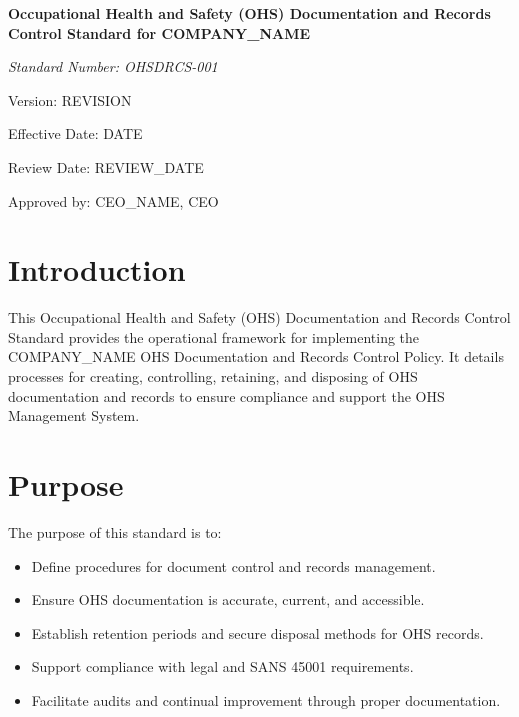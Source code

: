 \documentclass[12pt]{article}
\begin{document}
\begin{titlepage}
    \centering
    \vspace*{2cm}
    {\LARGE\bfseries Occupational Health and Safety (OHS) Documentation and Records Control Standard for {{COMPANY_NAME}}\par}
    \vspace{1cm}
    {\large\itshape Standard Number: OHSDRCS-001\par}
    \vspace{0.5cm}
    {\normalsize Version: {{REVISION}}\par}
    \vspace{0.5cm}
    {\normalsize Effective Date: {{DATE}}\par}
    \vspace{0.5cm}
    {\normalsize Review Date: {{REVIEW_DATE}}\par}
    \vspace{2cm}
    {\normalsize Approved by: {{CEO_NAME}}, CEO\par}
\end{titlepage}

\section{Introduction}
This Occupational Health and Safety (OHS) Documentation and Records Control Standard provides the operational framework for implementing the {{COMPANY_NAME}} OHS Documentation and Records Control Policy. It details processes for creating, controlling, retaining, and disposing of OHS documentation and records to ensure compliance and support the OHS Management System.

\section{Purpose}
The purpose of this standard is to:
\begin{itemize}
    \item Define procedures for document control and records management.
    \item Ensure OHS documentation is accurate, current, and accessible.
    \item Establish retention periods and secure disposal methods for OHS records.
    \item Support compliance with legal and SANS 45001 requirements.
    \item Facilitate audits and continual improvement through proper documentation.
\end{itemize}
\end{document}
